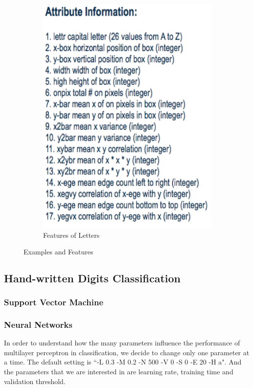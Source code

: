 \documentclass[11pt]{article}
\begin{document}
\begin{figure}[htbp]
\begin{subfigure}[htbp]{0.32\columnwidth}
\includegraphics*[width=\textwidth]{fig/feature_letter}
\caption{Features of Letters}
\label{fig:feature:letter}
\end{subfigure}
\caption{Examples and Features}
\end{figure}

\subsection{Hand-written Digits Classification}
\subsubsection{Support Vector Machine}

\subsubsection{Neural Networks}
In order to understand how the many parameters influence the performance of multilayer perceptron in classification, we decide to change only one parameter at a time. The default setting is ``-L 0.3 -M 0.2 -N 500 -V 0 -S 0 -E 20 -H a". And the parameters that we are interested in are learning rate, training time and validation threshold.
\end{document}
